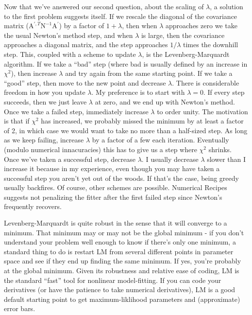 \documentclass[letterpaper,11pt,preprint]{aastex}
\begin{document}
{Now that we've answered our second question, about the scaling of
$\lambda$, a solution to the first problem suggests itself.  If we
rescale the diagonal of the covariance matrix ($\mathrm{A}^{',T}
\mathrm{N}^{-1} \mathrm{A}^{'}$) by a factor of $1+\lambda$, then when
$\lambda$ approaches zero we take the usual Newton's method step, and
when $\lambda$ is large, then the covariance approaches a
diagonal matrix, and the step approaches $1/\lambda$ times the
downhill step.  This, coupled with a scheme to update $\lambda$, is
the Levenberg-Marquardt algorithm.  If we take a ``bad'' step (where
bad is usually defined by an increase in $\chi^2$), then increase
$\lambda$ and try again from the same starting point.  If we take a
``good'' step, then move to the new point and decrease $\lambda$.
There is considerable freedom in how you update $\lambda$.  My
preference is to start with $\lambda=0$.  If every step succeeds, then
we just leave $\lambda$ at zero, and we end up with Newton's method.
Once we take a failed step, immediately increase $\lambda$ to order
unity.  The motivation is that if $\chi^2$ has increased, we probably
missed the minimum by at least a factor of 2, in which case we would
want to take no more than a half-sized step.  As long as we keep
failing, increase $\lambda$ by a factor of a few each iteration.
Eventually (modulo numerical innacuracies) this has to give us a step
where $\chi^2$ shrinks.  Once we've taken a successful step, decrease
$\lambda$.  I usually decrease $\lambda$ slower than I increase it
because in my experience, even though you may have taken a successful
step you aren't yet out of the woods.  If that's the case, being
greedy usually backfires.  Of course, other schemes are possible.
Numerical Recipes suggests not penalizing the fitter after the first
failed step since Newton's frequently recovers.

Levenberg-Marquardt is quite robust in the sense that it will converge
to a minimum.  That minimum may or may not be the global minimum - if
you don't understand your problem well enough to know if there's only
one minimum, a standard thing to do is restart LM from several
different points in parameter space and see if they end up finding the
same minimum.  If yes, you're probably at the global minimum.  Given
its robustness and relative ease of coding, LM is the standard
``fast'' tool for nonlinear model-fitting.  If you can code your
derivatives (or have the patience to take numerical derivatives), LM
is a good default starting point to get maximum-liklihood parameters
and (approximate) error bars.


}
\end{document}
